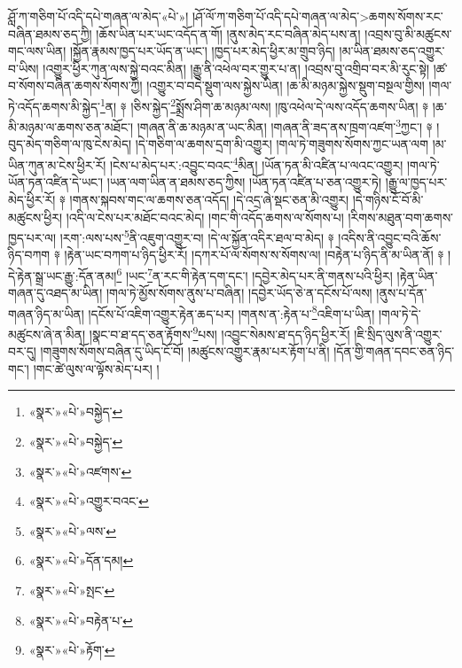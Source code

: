 ཤློ་ཀ་གཅིག་པོ་འདི་དཔེ་གཞན་ལ་མེད་«པེ་»། །ཤོ་ལོ་ཀ་གཅིག་པོ་འདི་དཔེ་གཞན་ལ་མེད་>ཆགས་སོགས་རང་བཞིན་ཐམས་ཅད་ཀྱི། །ཆོས་ཡིན་པར་ཡང་འདོད་ན་གོ། །ནུས་མེད་རང་བཞིན་མེད་པས་ན། །འབྲས་བུ་མི་མཚུངས་གང་ལས་ཡིན། །སྐྱོན་རྣམས་ཁྱད་པར་ཡོད་ན་ཡང་། །ཁྱད་པར་མེད་ཕྱིར་མ་གྲུབ་ཉིད། །མ་ཡིན་ཐམས་ཅད་འགྱུར་བ་ཡིས། །འགྱུར་ཕྱིར་ཀུན་ལས་སྐྱེ་བའང་མིན། །རྒྱུ་ནི་འཕེལ་བར་གྱུར་པ་ན། །འབྲས་བུ་འགྲིབ་བར་མི་རུང་སྟེ། །ཚ་བ་སོགས་བཞིན་ཆགས་སོགས་ཀྱི། །འགྱུར་བ་བདེ་སྡུག་ལས་སྐྱེས་ཡིན། །ཆ་མི་མཉམ་སྐྱེས་སྡུག་བསྔལ་གྱིས། །གལ་ཏེ་འདོད་ཆགས་མི་སྐྱེད་\footnote{«སྣར་»«པེ་»བསྐྱེད་}ན། ༈ །ཅིས་སྐྱེད་\footnote{«སྣར་»«པེ་»བསྐྱེད་}སྨྲོས་ཤིག་ཆ་མཉམ་ལས། །ཁུ་འཕེལ་དེ་ལས་འདོད་ཆགས་ཡིན། ༈ །ཆ་མི་མཉམ་ལ་ཆགས་ཅན་མཐོང་། །གཞན་ནི་ཆ་མཉམ་ན་ཡང་མིན། །གཞན་ནི་ཟད་ནས་ཁྲག་འཛག་\footnote{«སྣར་»«པེ་»འཛགས་}ཀྱང་། ༈ །བུད་མེད་གཅིག་ལ་ཁུ་ངེས་མེད། །དེ་གཅིག་ལ་ཆགས་དྲག་མི་འགྱུར། །གལ་ཏེ་གཟུགས་སོགས་ཀྱང་ཡན་ལག །མ་ཡིན་ཀུན་མ་ངེས་ཕྱིར་རོ། །ངེས་པ་མེད་པར་:འབྱུང་བའང་\footnote{«སྣར་»«པེ་»འགྱུར་བའང་}མིན། །ཡོན་ཏན་མི་འཛིན་པ་ལའང་འགྱུར། །གལ་ཏེ་ཡོན་ཏན་འཛིན་དེ་ཡང་། །ཡན་ལག་ཡིན་ན་ཐམས་ཅད་ཀྱིས། །ཡོན་ཏན་འཛིན་པ་ཅན་འགྱུར་ཏེ། །རྒྱུ་ལ་ཁྱད་པར་མེད་ཕྱིར་རོ། ༈ །གནས་སྐབས་གང་ལ་ཆགས་ཅན་འདོད། །དེ་འདྲ་ཞེ་སྡང་ཅན་མི་འགྱུར། །དེ་གཉིས་ངོ་བོ་མི་མཚུངས་ཕྱིར། །འདི་ལ་ངེས་པར་མཐོང་བའང་མེད། །གང་གི་འདོད་ཆགས་ལ་སོགས་པ། །རིགས་མཐུན་བག་ཆགས་ཁྱད་པར་ལ། །རག་:ལས་པས་\footnote{«སྣར་»«པེ་»ལས་}ནི་འཇུག་འགྱུར་བ། །དེ་ལ་སྐྱོན་འདིར་ཐལ་བ་མེད། ༈ །འདིས་ནི་འབྱུང་བའི་ཆོས་ཉིད་བཀག ༈ །རྟེན་ཡང་བཀག་པ་ཉིད་ཕྱིར་རོ། །དཀར་པོ་ལ་སོགས་ས་སོགས་ལ། །བརྟེན་པ་ཉིད་ནི་མ་ཡིན་ནོ། ༈ །དེ་རྟེན་སྒྲ་ཡང་རྒྱུ་:དོན་ནམ།\footnote{«སྣར་»«པེ་»དོན་དམ།} །ཡང་\footnote{«སྣར་»«པེ་»སྤང་}ན་རང་གི་རྟེན་དག་དང་། །དབྱེར་མེད་པར་ནི་གནས་པའི་ཕྱིར། །རྟེན་ཡིན་གཞན་དུ་འཐད་མ་ཡིན། །གལ་ཏེ་མྱོས་སོགས་ནུས་པ་བཞིན། །དབྱེར་ཡོད་ཅེ་ན་དངོས་པོ་ལས། །ནུས་པ་དོན་གཞན་ཉིད་མ་ཡིན། །དངོས་པོ་འཇིག་འགྱུར་རྟེན་ཆད་པར། །གནས་ན་:རྟེན་པ་\footnote{«སྣར་»«པེ་»བརྟེན་པ་}འཇིག་པ་ཡིན། །གལ་ཏེ་དེ་མཚུངས་ཞེ་ན་མིན། །སྣང་བ་ཐ་དད་ཅན་རྟོགས་\footnote{«སྣར་»«པེ་»རྟོག་}པས། །འབྱུང་སེམས་ཐ་དད་ཉིད་ཕྱིར་རོ། །ཇི་སྲིད་ལུས་ནི་འགྱུར་བར་དུ། །གཟུགས་སོགས་བཞིན་དུ་ཡིད་ངོ་བོ། །མཚུངས་འགྱུར་རྣམ་པར་རྟོག་པ་ནི། །དོན་གྱི་གཞན་དབང་ཅན་ཉིད་གང་། །གང་ཚེ་ལུས་ལ་ལྟོས་མེད་པར། །
